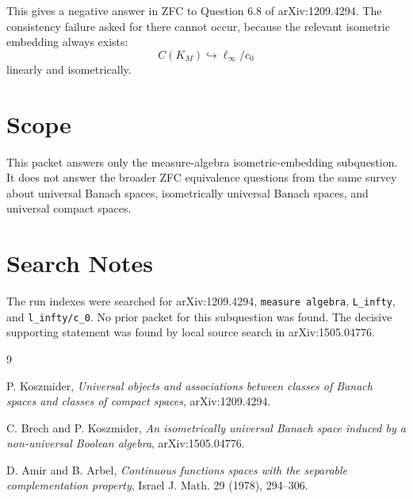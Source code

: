 \documentclass[11pt]{article}
\begin{document}
This gives a negative answer in ZFC to Question 6.8 of arXiv:1209.4294.
The consistency failure asked for there cannot occur, because the relevant
isometric embedding always exists:
\[
  C(K_M) \hookrightarrow \ell_\infty/c_0
\]
linearly and isometrically.

\section*{Scope}

This packet answers only the measure-algebra isometric-embedding subquestion.
It does not answer the broader ZFC equivalence questions from the same survey
about universal Banach spaces, isometrically universal Banach spaces, and
universal compact spaces.

\section*{Search Notes}

The run indexes were searched for arXiv:1209.4294, \texttt{measure algebra},
\texttt{L\_infty}, and \texttt{l\_infty/c\_0}. No prior packet for this
subquestion was found. The decisive supporting statement was found by local
source search in arXiv:1505.04776.

\begin{thebibliography}{9}

P. Koszmider,
\emph{Universal objects and associations between classes of Banach spaces and
classes of compact spaces}, arXiv:1209.4294.

C. Brech and P. Koszmider,
\emph{An isometrically universal Banach space induced by a non-universal
Boolean algebra}, arXiv:1505.04776.

D. Amir and B. Arbel,
\emph{Continuous functions spaces with the separable complementation property},
Israel J. Math. 29 (1978), 294--306.

\end{thebibliography}
\end{document}
